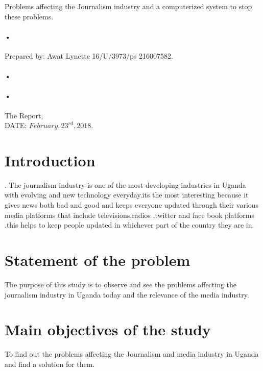 \documentclass[12pt,]{article}
\begin{document}
\begin{titlepage}
\centerline{Problems affecting the Journalism industry and a computerized system to stop these problems.\\}
\paragraph*{•}
\centerline{  Prepared by:  Awat Lynette 16/U/3973/ps 216007582.\\}
\paragraph*{•}
\paragraph*{•}
  \begin{flushright}
  The Report,\\
  DATE: $February,23^{rd},2018$.
 \tableofcontents

  \end{flushright}
\date{\today}
\end{titlepage}

\newpage


\section{Introduction}.
The journalism industry is one of the most developing industries in Uganda with evolving and new technology everyday.its the most interesting because it gives news both bad and good and keeps everyone updated through their various media platforms that include televisions,radios ,twitter and face book platforms .this helps to keep people updated in whichever part of the country they are in.

\section{Statement of the problem}
The purpose of this study is to observe and see the problems affecting the journalism industry in Uganda today and the relevance of the media industry.

\section{Main objectives of the study}
To find out the problems affecting the Journalism and media industry in Uganda and find a solution for them.
\end{document}
